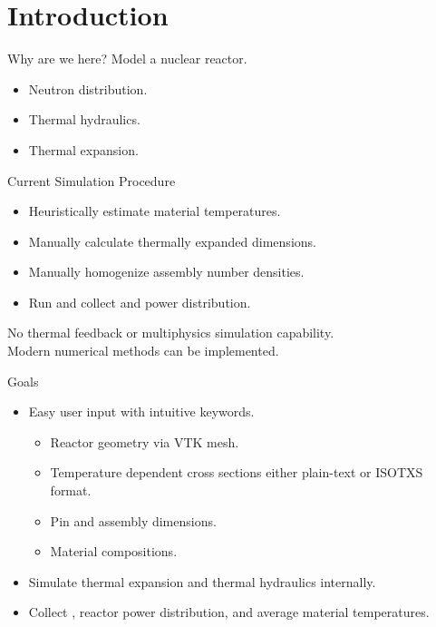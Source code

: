 \section{Introduction}
\label{sec:introduction}

\begin{frame}{Why are we here?}
  \pause
  {\huge Model a nuclear reactor.}
  \pause
  \begin{itemize}
    \item Neutron distribution.
    \item Thermal hydraulics.
    \item Thermal expansion.
  \end{itemize}
\end{frame}

\begin{frame}{Current Simulation Procedure}
  \begin{itemize}
    \item Heuristically estimate material temperatures.
    \item Manually calculate thermally expanded dimensions.
    \item Manually homogenize assembly number densities.
    \item Run \dif and collect \keff and power distribution.
    \pause
  \end{itemize}
  \vspace{0.3in}
  \begin{block}{}
    \centering
    No thermal feedback or multiphysics simulation capability.\\
    Modern numerical methods can be implemented.
  \end{block}
\end{frame}

\begin{frame}{Goals}
  \begin{itemize}
    \item Easy user input with intuitive keywords.
      \begin{itemize}
        \item Reactor geometry via VTK mesh.
        \item Temperature dependent cross sections either plain-text or ISOTXS
          format.
        \item Pin and assembly dimensions.
        \item Material compositions.
      \end{itemize}
    \item Simulate thermal expansion and thermal hydraulics internally.
    \item Collect \keff, reactor power distribution, and average material 
      temperatures.
  \end{itemize}
\end{frame}

